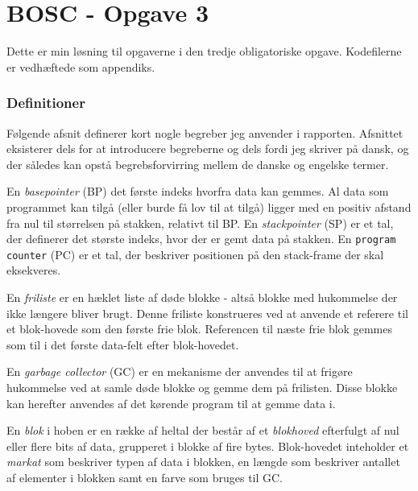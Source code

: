 \documentclass{article}
\begin{document}
\section*{BOSC - Opgave 3}
Dette er min løsning til opgaverne i den tredje obligatoriske opgave. Kodefilerne er vedhæftede som appendiks. 

\subsubsection*{Definitioner}
Følgende afsnit definerer kort nogle begreber jeg anvender i rapporten. Afsnittet eksisterer dels for at introducere begreberne og dels fordi jeg skriver på dansk, og der således kan opstå begrebsforvirring mellem de danske og engelske termer.

En \textit{basepointer} (BP) det første indeks hvorfra data kan gemmes. Al data som programmet kan tilgå (eller burde få lov til at tilgå) ligger med en positiv afstand fra nul til størrelsen på stakken, relativt til BP. En \textit{stackpointer} (SP) er et tal, der definerer det største indeks, hvor der er gemt data på stakken. En \texttt{program counter} (PC) er et tal, der beskriver positionen på den stack-frame der skal eksekveres.

En \textit{friliste} er en hæklet liste af døde blokke - altså blokke med hukommelse der ikke længere bliver brugt. Denne friliste konstrueres ved at anvende et referere til et blok-hovede som den første frie blok. Referencen til næste frie blok gemmes som til i det første data-felt efter blok-hovedet. 

En \textit{garbage collector} (GC) er en mekanisme der anvendes til at frigøre hukommelse ved at samle døde blokke og gemme dem på frilisten. Disse blokke kan herefter anvendes af det kørende program til at gemme data i.

En \textit{blok} i hoben er en række af heltal der består af et \textit{blokhoved} efterfulgt af nul eller flere bits af data, grupperet i blokke af fire bytes. Blok-hovedet inteholder et \textit{markat} som beskriver typen af data i blokken, en længde som beskriver antallet af elementer i blokken samt en farve som bruges til GC.
\end{document}
